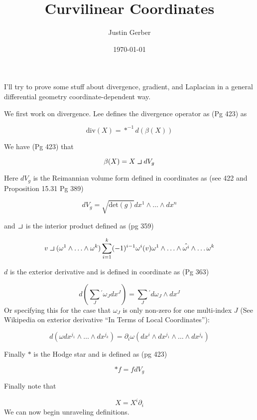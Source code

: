 \documentclass[12pt]{article}
\newcommand{\intprodl}{%
    \mathbin{\scalebox{1.5}{$\lrcorner$}}%
}
\begin{document}
\title{Curvilinear Coordinates}
\author{Justin Gerber}
\date{\today}
\maketitle

I'll try to prove some stuff about divergence, gradient, and Laplacian in a general differential geometry coordinate-dependent way.

We first work on divergence. Lee defines the divergence operator as (Pg 423) as

$$
\text{div}(X) = \ast^{-1} d(\beta(X))
$$

We have (Pg 423) that

$$
\beta(X) = X \intprodl dV_g
$$

Here $dV_g$ is the Reimannian volume form defined in coordinates as (see 422 and Proposition 15.31 Pg 389)

$$
dV_g = \sqrt{\text{det}(g)} dx^1\wedge\ldots \wedge dx^n
$$

and $\intprodl$ is the interior product defined as (pg 359)

$$
v\intprodl(\omega^1 \wedge \ldots \wedge \omega^k) \sum_{i=1}^k (-1)^{i-1} \omega^i(v) \omega^1\wedge \ldots \wedge \hat{\omega^i} \wedge \ldots \omega^k
$$

$d$ is the exterior derivative and is defined in coordinate as (Pg 363)

$$
d \left(\sum_J{}^{'} \omega_J dx^J\right) = \sum_J {}^{'} d\omega_J \wedge dx^J
$$
Or specifying this for the case that $\omega_J$ is only non-zero for one multi-index $J$ (See Wikipedia on exterior derivative ``In Terms of Local Coordinates''):

$$
d (\omega dx^{j_1} \wedge \ldots \wedge dx^{j_k}) = \partial_i\omega ( dx^i \wedge dx^{j_1} \wedge \ldots \wedge dx^{j_k})
$$

Finally $\ast$ is the Hodge star and is defined as (pg 423)

$$
\ast f = f dV_g
$$

Finally note that 

$$
X = X^i \partial_i
$$
We can now begin unraveling definitions.
\end{document}
